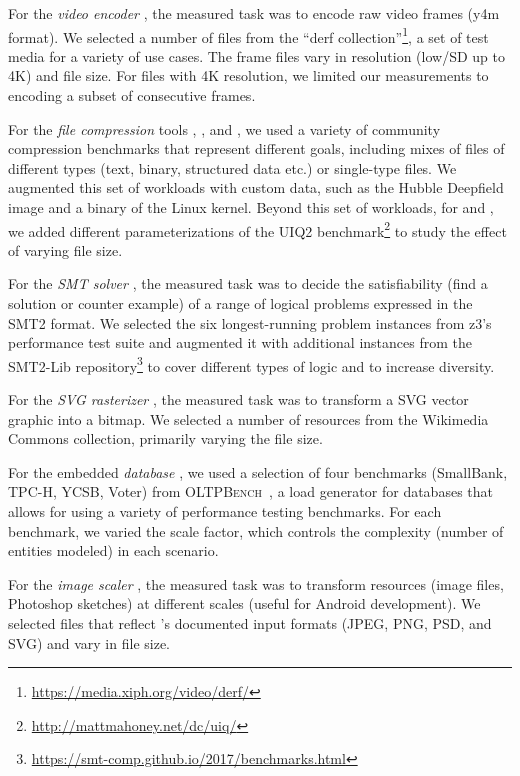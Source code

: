 {{For the \textit{video encoder} \xzwo, the measured task was to encode raw video frames (y4m format). We selected a number of files from the “derf collection”\footnote{\url{https://media.xiph.org/video/derf/}}, a set of test media for a variety of use cases. The frame files vary in resolution (low/SD up to 4K) and file size. For files with 4K resolution, we limited our measurements to encoding a subset of consecutive frames.

For the \textit{file compression} tools \kanzi, \xz, and \lrzip, we used a variety of community compression benchmarks that represent different goals, including mixes of files of different types (text, binary, structured data etc.) or single-type files. We augmented this set of workloads with custom data, such as the Hubble Deepfield image and a binary of the Linux kernel. Beyond this set of workloads, for \xz and \lrzip, we added different parameterizations of the UIQ2 benchmark\footnote{\url{http://mattmahoney.net/dc/uiq/}} to study the effect of varying file size. 

For the \textit{SMT solver} \zdrei, the measured task was to decide the satisfiability (find a solution or counter example) of a range of logical problems expressed in the SMT2 format. We selected the six longest-running problem instances from z3’s performance test suite and augmented it with additional instances from the SMT2-Lib repository\footnote{\url{https://smt-comp.github.io/2017/benchmarks.html}} to cover different types of logic and to increase diversity.

For the \textit{SVG rasterizer} \batik, the measured task was to transform a SVG vector graphic into a bitmap. We selected a number of resources from the Wikimedia Commons collection, primarily varying the file size.

For the embedded \textit{database} \htwo, we used a selection of four benchmarks (SmallBank, TPC-H, YCSB, Voter) from \textsc{OLTPBench}~\cite{difallah_oltp_2013}, a load generator for databases that allows for using a variety of performance testing benchmarks. For each benchmark, we varied the scale factor, which controls the complexity (number of entities modeled) in each scenario.

For the \textit{image scaler} \dconvert, the measured task was to transform resources (image files, Photoshop sketches) at different scales (useful for Android development). We selected files that reflect \dconvert's documented input formats (JPEG, PNG, PSD, and SVG) and vary in file size.
}

}
